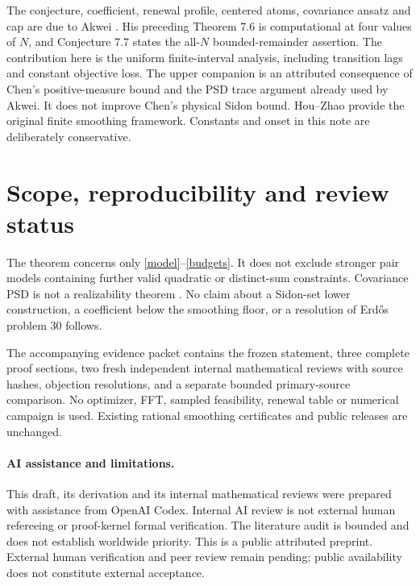 \documentclass[11pt]{article}
\begin{document}
The conjecture, coefficient, renewal profile, centered atoms, covariance
ansatz and cap are due to Akwei \cite[Section 7]{akwei}. His preceding
Theorem 7.6 is computational at four values of \(N\), and Conjecture 7.7
states the all-\(N\) bounded-remainder assertion. The contribution here is
the uniform finite-interval analysis, including transition lags and
constant objective loss. The upper companion is an attributed consequence
of Chen's positive-measure bound \cite{chen} and the PSD trace argument
already used by Akwei. It does not improve Chen's physical Sidon bound.
Hou--Zhao \cite{hz} provide the original finite smoothing framework.
Constants and onset in this note are deliberately conservative.





\section{Scope, reproducibility and review status}
The theorem concerns only \eqref{model}--\eqref{budgets}. It does not exclude
stronger pair models containing further valid quadratic or distinct-sum
constraints. Covariance PSD is not a realizability theorem
\cite{kuna}. No claim about a Sidon-set lower construction, a coefficient
below the smoothing floor, or a resolution of Erd\H{o}s problem 30 follows.

The accompanying evidence packet contains the frozen statement,
three complete proof sections, two fresh independent internal mathematical
reviews with source hashes, objection resolutions, and a separate bounded
primary-source comparison. No optimizer, FFT, sampled feasibility,
renewal table or numerical campaign is used. Existing rational smoothing
certificates and public releases are unchanged.

\paragraph{AI assistance and limitations.}
This draft, its derivation and its internal mathematical reviews were
prepared with assistance from OpenAI Codex. Internal AI review is not external
human refereeing or proof-kernel formal verification. The literature audit
is bounded and does not establish worldwide priority. This is a public
attributed preprint. External human verification and peer review remain
pending; public availability does not constitute external acceptance.
\end{document}
